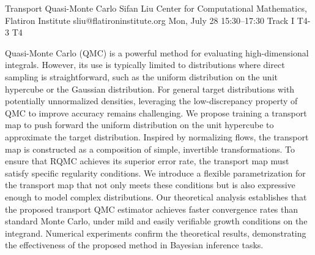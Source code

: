 \begin{talk}
  {Transport Quasi-Monte Carlo}%
  {Sifan Liu}%
  {Center for Computational Mathematics, Flatiron Institute}%
  {sliu@flatironinstitute.org}%
  {}%
  {}%
  {Mon, July 28 15:30–17:30 Track I}%
  {T4-3}%
  {T4}%
  {}%
  
				
			
Quasi-Monte Carlo (QMC) is a powerful method for evaluating high-dimensional integrals. However, its use is typically limited to distributions where direct sampling is straightforward, such as the uniform distribution on the unit hypercube or the Gaussian distribution. For general target distributions with potentially unnormalized densities, leveraging the low-discrepancy property of QMC to improve accuracy remains challenging. We propose training a transport map to push forward the uniform distribution on the unit hypercube to approximate the target distribution. Inspired by normalizing flows, the transport map is constructed as a composition of simple, invertible transformations. To ensure that RQMC achieves its superior error rate, the transport map must satisfy specific regularity conditions. We introduce a flexible parametrization for the transport map that not only meets these conditions but is also expressive enough to model complex distributions. Our theoretical analysis establishes that the proposed transport QMC estimator achieves faster convergence rates than standard Monte Carlo, under mild and easily verifiable growth conditions on the integrand. Numerical experiments confirm the theoretical results, demonstrating the effectiveness of the proposed method in Bayesian inference tasks.


\medskip


\end{talk}

